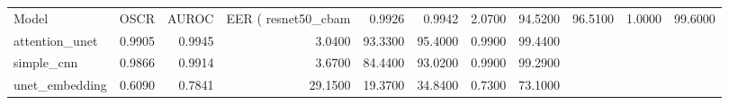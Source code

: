 \begin{tabular}{lrrrrrrr}
\toprule
Model & OSCR & AUROC & EER (%
\midrule
resnet50_cbam & 0.9926 & 0.9942 & 2.0700 & 94.5200 & 96.5100 & 1.0000 & 99.6000 \\
attention_unet & 0.9905 & 0.9945 & 3.0400 & 93.3300 & 95.4000 & 0.9900 & 99.4400 \\
simple_cnn & 0.9866 & 0.9914 & 3.6700 & 84.4400 & 93.0200 & 0.9900 & 99.2900 \\
unet_embedding & 0.6090 & 0.7841 & 29.1500 & 19.3700 & 34.8400 & 0.7300 & 73.1000 \\
\bottomrule
\end{tabular}
